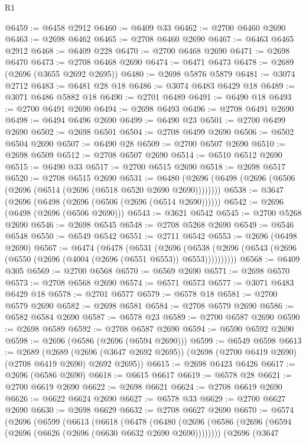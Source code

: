 \begin{lexlean}{R1}
\begin{coremodule}
@6459 := @6458 @2912
@6460 := @6409 @33
@6462 := @2700 @6460 @2690
@6463 := @2698 @6462
@6465 := @2708 @6460 @2690
@6467 := @6463 @6465 @2912
@6468 := @6409 @228
@6470 := @2700 @6468 @2690
@6471 := @2698 @6470
@6473 := @2708 @6468 @2690
@6474 := @6471 @6473
@6478 := @2689 (@2696 (@3655 @2692 @2695))
@6480 := @2698 @5876 @5879
@6481 := @3074 @2712
@6483 := @6481 @28 @18
@6486 := @3074 @6483 @6429 @18
@6489 := @3071 @6486 @5882 @18
@6490 := @2701 @6489
@6491 := @6490 @18
@6493 := @2700 @6491 @2690
@6494 := @2698 @6493
@6496 := @2708 @6491 @2690
@6498 := @6494 @6496 @2690
@6499 := @6490 @23
@6501 := @2700 @6499 @2690
@6502 := @2698 @6501
@6504 := @2708 @6499 @2690
@6506 := @6502 @6504 @2690
@6507 := @6490 @28
@6509 := @2700 @6507 @2690
@6510 := @2698 @6509
@6512 := @2708 @6507 @2690
@6514 := @6510 @6512 @2690
@6515 := @6490 @33
@6517 := @2700 @6515 @2690
@6518 := @2698 @6517
@6520 := @2708 @6515 @2690
@6531 := @6480 (@2696 (@6498 (@2696 (@6506 (@2696 (@6514 (@2696 (@6518 @6520 @2690 @2690))))))))
@6538 := @3647 (@2696 (@6498 (@2696 (@6506 (@2696 (@6514 @2690))))))
@6542 := @2696 (@6498 (@2696 (@6506 @2690)))
@6543 := @3621 @6542
@6545 := @2700 @5268 @2690
@6546 := @2698 @6545
@6548 := @2708 @5268 @2690
@6549 := @6546 @6548
@6550 := @6549 @6542
@6551 := @2711 @6542
@6553 := @2696 (@6498 @2690)
@6567 := @6474
    (@6478
      (@6531
        (@2696
          (@6538 (@2696 (@6543 (@2696 (@6550 (@2696 (@4004 (@2696 (@6551 @6553)) @6553))))))))))
@6568 := @6409 @305
@6569 := @2700 @6568
@6570 := @6569 @2690
@6571 := @2698 @6570
@6573 := @2708 @6568 @2690
@6574 := @6571 @6573
@6577 := @3071 @6483 @6429 @18
@6578 := @2701 @6577
@6579 := @6578 @18
@6581 := @2700 @6579 @2690
@6582 := @2698 @6581
@6584 := @2708 @6579 @2690
@6586 := @6582 @6584 @2690
@6587 := @6578 @23
@6589 := @2700 @6587 @2690
@6590 := @2698 @6589
@6592 := @2708 @6587 @2690
@6594 := @6590 @6592 @2690
@6598 := @2696 (@6586 (@2696 (@6594 @2690)))
@6599 := @6549 @6598
@6613 := @2689
    (@2689 (@2696 (@3647 @2692 @2695)) (@2698 (@2700 @6419 @2690) (@2708 @6419 @2690) @2692 @2695))
@6615 := @2698 @6423 @6426
@6617 := @2696 (@6586 @2690)
@6618 := @6615 @6617
@6619 := @6578 @28
@6621 := @2700 @6619 @2690
@6622 := @2698 @6621
@6624 := @2708 @6619 @2690
@6626 := @6622 @6624 @2690
@6627 := @6578 @33
@6629 := @2700 @6627 @2690
@6630 := @2698 @6629
@6632 := @2708 @6627 @2690
@6670 := @6574
    (@2696
      (@6599
        (@6613
          (@6618
            (@6478
              (@6480
                (@2696 (@6586 (@2696 (@6594 (@2696 (@6626 (@2696 (@6630 @6632 @2690 @2690))))))))
                (@2696
                  (@3647

\end{coremodule}
\end{lexlean}
